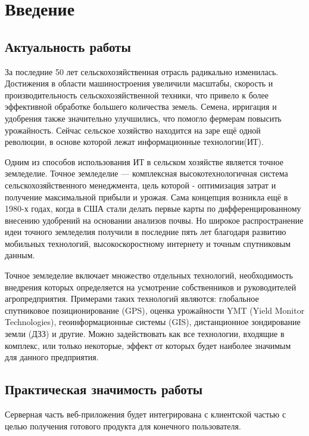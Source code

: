 \chapter{Введение}
    \section{Актуальность работы}

    За последние 50 лет сельскохозяйственная отрасль радикально изменилась. Достижения в области машиностроения увеличили масштабы, скорость и производительность сельскохозяйственной техники, что привело к более эффективной обработке большего количества земель. Семена, ирригация и удобрения также значительно улучшились, что помогло фермерам повысить урожайность. Сейчас сельское хозяйство находится на заре ещё одной революции, в основе которой лежат информационные технологии(ИТ). 
    
    Одним из способов использования ИТ в сельском хозяйстве является точное земледелие. Точное земледелие — комплексная высокотехнологичная система сельскохозяйственного менеджмента, цель которой - оптимизация затрат и получение максимальной прибыли и урожая. Сама концепция возникла ещё в 1980-х годах, когда в США стали делать первые карты по дифференцированному внесению удобрений на основании анализов почвы. \cite{iowa} Но широкое распространение идеи точного земледелия получили в последние пять лет благодаря развитию мобильных технологий, высокоскоростному интернету и точным спутниковым данным. \cite{wiki1, onesoil_blog}
    
    Точное земледелие включает множество отдельных технологий, необходимость внедрения которых определяется на усмотрение собственников и руководителей агропредприятия. Примерами таких технологий являются: глобальное спутниковое позиционирование (GPS), оценка урожайности YMT (Yield Monitor Technologies), геоинформационные системы (GIS), дистанционное зондирование земли (ДЗЗ) и другие.  Можно задействовать как все технологии, входящие в комплекс, или только некоторые, эффект от которых будет наиболее значимым для данного предприятия. \cite{kursk, bis}



    \section{Практическая значимость работы}
    
    Серверная часть веб-приложения будет интегрирована с клиентской частью с целью получения готового продукта для конечного пользователя.

